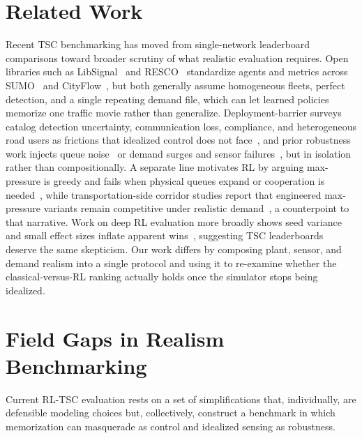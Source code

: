 \documentclass[conference]{IEEEtran}
\begin{document}
\section{Related Work}

Recent TSC benchmarking has moved from single-network leaderboard comparisons toward broader scrutiny of what realistic evaluation requires. Open libraries such as LibSignal~\cite{mei2023libsignal} and RESCO~\cite{ault2021resco} standardize agents and metrics across SUMO~\cite{lopez2018sumo} and CityFlow~\cite{zhang2019cityflow}, but both generally assume homogeneous fleets, perfect detection, and a single repeating demand file, which can let learned policies memorize one traffic movie rather than generalize. Deployment-barrier surveys catalog detection uncertainty, communication loss, compliance, and heterogeneous road users as frictions that idealized control does not face~\cite{chen2022realdeal}, and prior robustness work injects queue noise~\cite{tan2020robust} or demand surges and sensor failures~\cite{rodrigues2019towards}, but in isolation rather than compositionally. A separate line motivates RL by arguing max-pressure is greedy and fails when physical queues expand or cooperation is needed~\cite{wei2019presslight, wei2019colight, wei2019survey, noaeen2021recent}, while transportation-side corridor studies report that engineered max-pressure variants remain competitive under realistic demand~\cite{islam2022mprealistic}, a counterpoint to that narrative. Work on deep RL evaluation more broadly shows seed variance and small effect sizes inflate apparent wins~\cite{henderson2018matters, colas2018seeds, agarwal2021rliable}, suggesting TSC leaderboards deserve the same skepticism. Our work differs by composing plant, sensor, and demand realism into a single protocol and using it to re-examine whether the classical-versus-RL ranking actually holds once the simulator stops being idealized.

\section{Field Gaps in Realism Benchmarking}

Current RL-TSC evaluation rests on a set of simplifications that, individually, are defensible modeling choices but, collectively, construct a benchmark in which memorization can masquerade as control and idealized sensing as robustness.
\end{document}
